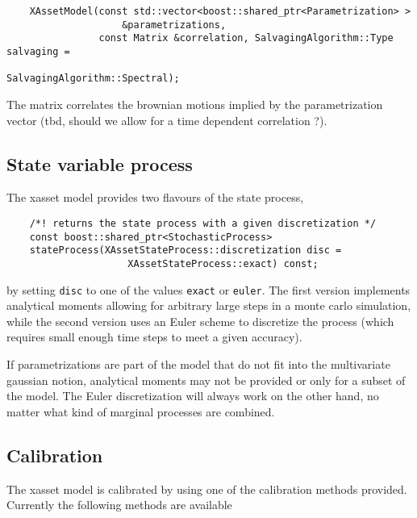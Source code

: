\documentclass[12pt, a4paper]{article}
\begin{document}
\medskip
\scriptsize
\begin{verbatim}
    XAssetModel(const std::vector<boost::shared_ptr<Parametrization> >
                    &parametrizations,
                const Matrix &correlation, SalvagingAlgorithm::Type salvaging =
                                               SalvagingAlgorithm::Spectral);
\end{verbatim}
\normalsize
\medskip

The matrix correlates the brownian motions implied by the parametrization vector (tbd, should we allow for a time dependent correlation ?).

\subsection{State variable process}

The xasset model provides two flavours of the state process,

\medskip
\scriptsize
\begin{verbatim}
    /*! returns the state process with a given discretization */
    const boost::shared_ptr<StochasticProcess>
    stateProcess(XAssetStateProcess::discretization disc =
                     XAssetStateProcess::exact) const;
\end{verbatim}
\normalsize
\medskip

by setting \verb+disc+ to one of the values \verb+exact+ or \verb+euler+. The first version implements analytical moments allowing for arbitrary large steps in a monte carlo simulation, while the second version uses an Euler scheme to discretize the process (which requires small enough time steps to meet a given accuracy).

If parametrizations are part of the model that do not fit into the multivariate gaussian notion, analytical moments may not be provided or only for a subset of the model. The Euler discretization will always work on the other hand, no matter what kind of marginal processes are combined.

\subsection{Calibration}

The xasset model is calibrated by using one of the calibration methods provided. Currently the following methods are available
\end{document}
